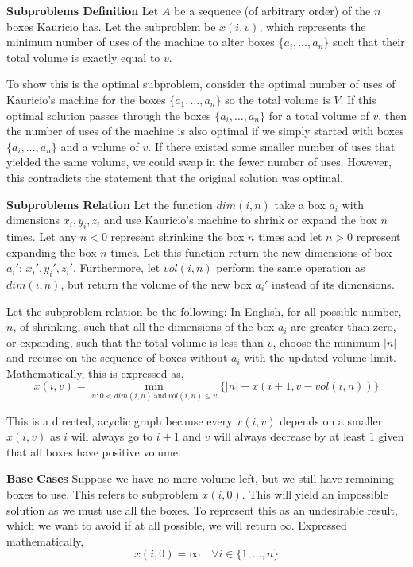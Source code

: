 \documentclass[12pt,twoside]{article}
\begin{document}
\begin{problems}

\problem  %

{\bf Subproblems Definition} Let $A$ be a sequence (of arbitrary order) of
the $n$ boxes Kauricio has. Let the subproblem be $x(i, v)$, which represents
the minimum number of uses of the machine to alter boxes $\{a_i, \ldots,
a_n\}$ such that their total volume is exactly equal to $v$.

To show this is the optimal subproblem, consider the optimal number of uses
of Kauricio's machine for the boxes $\{a_1, \ldots, a_n\}$ so the total
volume is $V$. If this optimal solution passes through the boxes $\{a_i,
\ldots, a_n\}$ for a total volume of $v$, then the number of uses of the
machine is also optimal if we simply started with boxes $\{a_i, \ldots,
a_n\}$ and a volume of $v$. If there existed some smaller number of uses
that yielded the same volume, we could swap in the fewer number of uses.
However, this contradicts the statement that the original solution was
optimal.

{\bf Subproblems Relation} Let the function $dim(i, n)$ take a box $a_i$ with
dimensions $x_i, y_i, z_i$ and use Kauricio's machine to shrink or expand the
box $n$ times. Let any $n < 0$ represent shrinking the box $n$ times and let
$n > 0$ represent expanding the box $n$ times. Let this function return the
new dimensions of box $a_i'$: $x_i', y_i', z_i'$. Furthermore, let $vol(i,
n)$ perform the same operation as $dim(i, n)$, but return the volume of the
new box $a_i'$ instead of its dimensions.

Let the subproblem relation be the following: In English, for all possible
number, $n$, of shrinking, such that all the dimensions of the box $a_i$ are
greater than zero, or expanding, such that the total volume is less than $v$,
choose the minimum $|n|$ and recurse on the sequence of boxes without $a_i$
with the updated volume limit. Mathematically, this is expressed as,
$$ x(i, v) = \min_{n : 0 < dim(i, n)\ \mathrm{and}\ vol(i, n) \leq v} \{ |n|
+ x(i + 1, v - vol(i, n)) \} $$

This is a directed, acyclic graph because every $x(i, v)$ depends on a
smaller $x(i, v)$ as $i$ will always go to $i + 1$ and $v$ will always
decrease by at least $1$ given that all boxes have positive volume.

{\bf Base Cases} Suppose we have no more volume left, but we still have
remaining boxes to use. This refers to subproblem $x(i, 0)$. This will yield
an impossible solution as we must use all the boxes. To represent this as an
undesirable result, which we want to avoid if at all possible, we will return
$\infty$. Expressed mathematically,
$$ x(i, 0) = \infty\quad \forall i \in \{1, \ldots, n\} $$


\end{problems}
\end{document}
